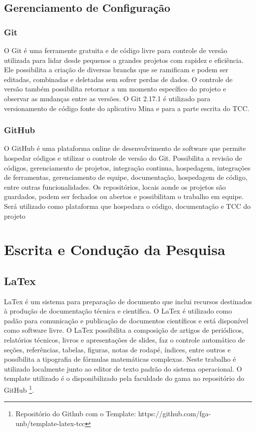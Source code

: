 \subsection{Gerenciamento de Configuração}

\subsubsection{Git}

O Git \cite{git2020} é uma ferramente gratuita e de código livre para controle de versão utilizada para lidar desde pequenos a grandes projetos com rapidez e eficiência. Ele possibilita a criação de diversas branchs que se ramificam e podem ser editadas, combinadas e deletadas sem sofrer perdas de dados. O controle de versão também possibilita retornar a um momento específico do projeto e observar as mudanças entre as versões. O Git 2.17.1 é utilizado para versionamento de código fonte do aplicativo Mina e para a parte escrita do TCC.


\subsubsection{GitHub}

O GitHub \cite{github2020} é uma plataforma online de desenvolvimento de software que permite hospedar códigos e utilizar o controle de versão do Git. Possibilita a revisão de códigos, gerenciamento de projetos, integração continua, hospedagem, integrações de ferramentas, gerenciamento de equipe, documentação, hospedagem de código, entre outras funcionalidades. Os repositórios, locais aonde os projetos são guardados, podem ser fechados ou abertos e possibilitam o trabalho em equipe. Será utilizado como plataforma que hospedara o código, documentação e TCC do projeto

\section{Escrita e Condução da Pesquisa}

\subsection{LaTex}

LaTex \cite{latex2020} é um sistema para preparação de documento que inclui recursos destinados à produção de documentação técnica e científica. O LaTex é utilizado como padão para comunicação e publicação de documentos científicos e está disponível como software livre. O LaTex possibilita a composição de artigos de periódicos, relatórios técnicos, livros e apresentações de slides, faz o controle automático de seções, referências, tabelas, figuras, notas de rodapé, índices, entre outros e possíbilita a tipografia de fórmulas matemáticas complexas. Neste trabalho é utilizado localmente junto ao editor de texto padrão do sistema operacional. O template utilizado é o disponibilizado pela faculdade do gama no repositório do GitHub \footnote{Repositório do Github com o Template: https://github.com/fga-unb/template-latex-tcc}.


